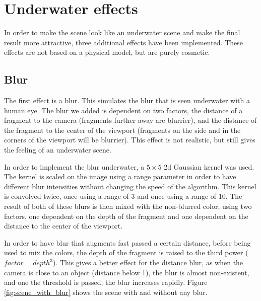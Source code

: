\documentclass{article}
\begin{document}
\section{Underwater effects}
\label{sec:underwater}

In order to make the scene look like an underwater scene and make the final result more attractive, three additional effects have been implemented. These effects are not based on a physical model, but are purely cosmetic. 

\subsection{Blur}
The first effect is a blur. This simulates the blur that is seen underwater with a human eye. The blur we added is dependent on two factors, the distance of a fragment to the camera (fragments further away are blurrier), and the distance of the fragment to the center of the viewport (fragments on the side and in the corners of the viewport will be blurrier). This effect is not realistic, but still gives the feeling of an underwater scene.

\medskip \par
\noindent
In order to implement the blur underwater, a $5\times5$ 2d Gaussian kernel was used. The kernel is scaled on the image using a range parameter in order to have different blur intensities without changing the speed of the algorithm. This kernel is convolved twice, once using a range of 3 and once using a range of 10. The result of both of these blurs is then mixed with the non-blurred color, using two factors, one dependent on the depth of the fragment and one dependent on the distance to the center of the viewport.

\medskip \par
\noindent
In order to have blur that augments fast passed a certain distance, before being used to mix the colors, 
the depth of the fragment is raised to the third power ($factor = depth^3$). 
This gives a better effect for the distance blur, as when the camera is close to an object (distance below 1), 
the blur is almost non-existent, and one the threshold is passed, the blur increases rapidly.
Figure \ref{fig:scene_with_blur} shows the scene with and without any blur.

\vspace{-1em}
\end{document}
